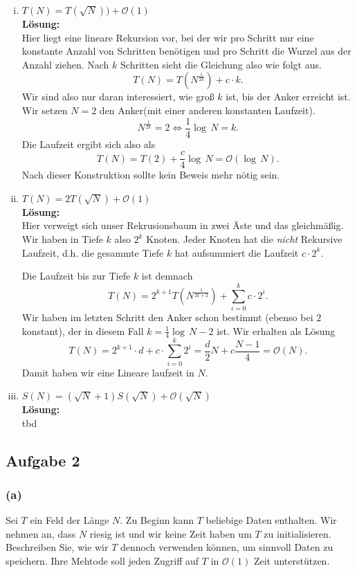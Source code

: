 \documentclass[11pt,a4paper,ngerman]{article}
\begin{document}
\begin{enumerate}[(i)]
	\item $T(N) = T(\sqrt{N})) + \mathcal{O}(1)$\\
	\noindent\textbf{Lösung:}\\
		Hier liegt eine lineare Rekursion vor, bei der wir pro Schritt nur eine konstante Anzahl von Schritten benötigen
		und pro Schritt die Wurzel aus der Anzahl ziehen. Nach $k$ Schritten sieht die Gleichung also wie folgt aus.
		$$
			T(N) = T(N^\frac{1}{2k}) + c \cdot k.
		$$
		Wir sind also nur daran interessiert, wie groß $k$ ist, bis der Anker erreicht ist. Wir setzen $N=2$ den Anker(mit
		einer anderen konstanten Laufzeit).
		$$
			N^\frac{1}{2k} = 2 \Leftrightarrow \frac{1}{4} \log \, N = k.
		$$
		Die Laufzeit ergibt sich also als
		$$
			T(N) = T(2) + \frac{c}{4} \log \, N = \mathcal{O}(\log \, N).
		$$
		Nach dieser Konstruktion sollte kein Beweis mehr nötig sein.

	\item $T(N) = 2T(\sqrt{N}) + \mathcal{O}(1)$\\
	\noindent\textbf{Lösung:}\\
		Hier verweigt sich unser Rekrusionsbaum in zwei Äste und das gleichmäßig.
		Wir haben in Tiefe $k$ also $2^k$ Knoten. Jeder Knoten hat die \emph{nicht} Rekursive Laufzeit,
		d.h. die gesammte Tiefe $k$ hat aufsummiert die Laufzeit $c \cdot 2^k$.

		Die Laufzeit bis zur Tiefe $k$ ist demnach
		$$
			T(N) = 2^{k+1}T(N^\frac{1}{2k+2}) + \sum_{i=0}^kc \cdot 2^i.
		$$
		Wir haben im letzten Schritt den Anker schon bestimmt (ebenso bei $2$ konstant), 
		der in diesem Fall $k = \frac{1}{4} \log \, N - 2$ ist.
		Wir erhalten als Lösung
		$$
			T(N) = 2^{k+1} \cdot d + c \cdot \sum_{i=0}^k 2^i = \frac{d}{2} N + c \frac{N - 1}{4} = \mathcal{O}(N).
		$$
		Damit haben wir eine Lineare laufzeit in $N$.

	\item $S(N) = \left( \sqrt{N} + 1 \right) S( \sqrt{N}) + \mathcal{O}(\sqrt{N})$\\
	\noindent\textbf{Lösung:}\\
		tbd
\end{enumerate}

\subsection*{Aufgabe 2}

\subsubsection*{(a)}
Sei $T$ ein Feld der Länge $N$. Zu Beginn kann $T$ beliebige Daten enthalten. Wir nehmen an, dass $N$ riesig ist und wir keine Zeit haben um $T$ zu initialisieren. Beschreiben Sie, wie wir $T$ dennoch verwenden können, um sinnvoll Daten zu speichern. Ihre Mehtode soll jeden Zugriff auf $T$ in $\mathcal{O}(1)$ Zeit unterstützen.\\
\end{document}
